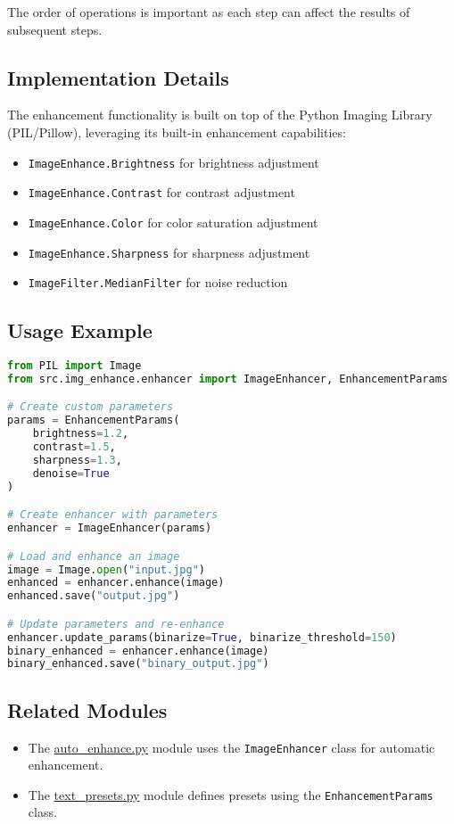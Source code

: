 The order of operations is important as each step can affect the results of subsequent steps.

\subsection{Implementation Details}
The enhancement functionality is built on top of the Python Imaging Library (PIL/Pillow), leveraging its built-in enhancement capabilities:

\begin{itemize}
    \item \texttt{ImageEnhance.Brightness} for brightness adjustment
    \item \texttt{ImageEnhance.Contrast} for contrast adjustment
    \item \texttt{ImageEnhance.Color} for color saturation adjustment
    \item \texttt{ImageEnhance.Sharpness} for sharpness adjustment
    \item \texttt{ImageFilter.MedianFilter} for noise reduction
\end{itemize}

\subsection{Usage Example}
\begin{lstlisting}[language=Python, caption=Example usage of ImageEnhancer]
from PIL import Image
from src.img_enhance.enhancer import ImageEnhancer, EnhancementParams

# Create custom parameters
params = EnhancementParams(
    brightness=1.2,
    contrast=1.5,
    sharpness=1.3,
    denoise=True
)

# Create enhancer with parameters
enhancer = ImageEnhancer(params)

# Load and enhance an image
image = Image.open("input.jpg")
enhanced = enhancer.enhance(image)
enhanced.save("output.jpg")

# Update parameters and re-enhance
enhancer.update_params(binarize=True, binarize_threshold=150)
binary_enhanced = enhancer.enhance(image)
binary_enhanced.save("binary_output.jpg")
\end{lstlisting}

\subsection{Related Modules}
\begin{itemize}
    \item The \hyperref[sec:auto_enhance]{auto\_enhance.py} module uses the \texttt{ImageEnhancer} class for automatic enhancement.
    \item The \hyperref[sec:text_presets]{text\_presets.py} module defines presets using the \texttt{EnhancementParams} class.
\end{itemize} 